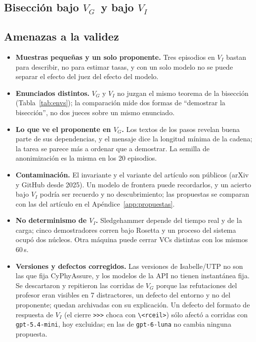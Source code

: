 \documentclass[11pt,a4paper]{article}
\theoremstyle{definition}
\theoremstyle{remark}
\newcommand{\lab}[1]{\textsc{#1}}
\newcommand{\VG}{\texorpdfstring{$V_G$}{V\_G}}
\newcommand{\VI}{\texorpdfstring{$V_I$}{V\_I}}
\begin{document}
\ComentarioGrafo

\subsection{Bisección bajo \VG\ y bajo \VI}\label{sec:comparacion}

\begin{table}[!ht]
\centering
\scriptsize
\TablaEtiquetasI
\caption{Etiquetas de $V_I$ sobre todos los intentos. La razón de deriva de $V_I$ es \lab{Statement\_Drift}/\lab{VC\_Open}.}
\label{tab:etiquetasI}
\end{table}

{\scriptsize
\TablaIntentosI
}

\ComentarioComparacion

\subsection{Amenazas a la validez}\label{sec:amenazas}

\begin{itemize}
  \item \textbf{Muestras pequeñas y un solo proponente.} Tres episodios en $V_I$ bastan para describir, no para estimar tasas, y con un solo modelo no se puede separar el efecto del juez del efecto del modelo.
  \item \textbf{Enunciados distintos.} $V_G$ y $V_I$ no juzgan el mismo teorema de la bisección (Tabla~\ref{tab:envs}); la comparación mide dos formas de ``demostrar la bisección'', no dos jueces sobre un mismo enunciado.
  \item \textbf{Lo que ve el proponente en $V_G$.} Los textos de los pasos revelan buena parte de sus dependencias, y el mensaje dice la longitud mínima de la cadena; la tarea se parece más a ordenar que a demostrar. La semilla de anonimización es la misma en los 20 episodios.
  \item \textbf{Contaminación.} El invariante y el variante del artículo son públicos (arXiv y GitHub desde 2025). Un modelo de frontera puede recordarlos, y un acierto bajo $V_I$ podría ser recuerdo y no descubrimiento; las propuestas se comparan con las del artículo en el Apéndice~\ref{app:propuestas}.
  \item \textbf{No determinismo de $V_I$.} Sledgehammer depende del tiempo real y de la carga; cinco demostradores corren bajo Rosetta y un proceso del sistema ocupó dos núcleos. Otra máquina puede cerrar VCs distintas con los mismos 60\,s.
  \item \textbf{Versiones y defectos corregidos.} Las versiones de Isabelle/UTP no son las que fija CyPhyAssure, y los modelos de la API no tienen instantánea fija. Se descartaron y repitieron las corridas de $V_G$ porque las refutaciones del profesor eran visibles en 7 distractores, un defecto del entorno y no del proponente; quedan archivadas con su explicación. Un defecto del formato de respuesta de $V_I$ (el cierre \texttt{>{}>{}>} choca con \texttt{\textbackslash<rceil>}) sólo afectó a corridas con \texttt{gpt-5.4-mini}, hoy excluidas; en las de \texttt{gpt-6-luna} no cambia ninguna propuesta.
\end{itemize}
\end{document}
